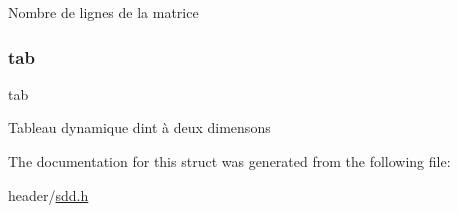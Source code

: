 Nombre de lignes de la matrice \mbox{\label{structdyn__mat_af1ffd7c07d3cf727dfbec1ee327606fa}} 
\subsubsection{\texorpdfstring{tab}{tab}}
{\footnotesize\ttfamily tab}

Tableau dynamique d\textquotesingle{}int à deux dimensons 

The documentation for this struct was generated from the following file\+:\begin{DoxyCompactItemize}
\item 
header/\hyperlink{sdd_8h}{sdd.\+h}\end{DoxyCompactItemize}

